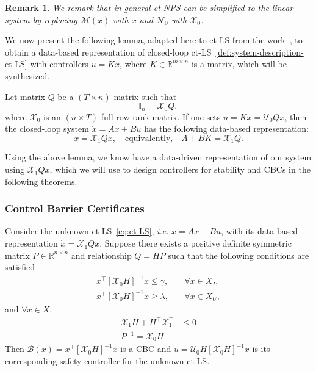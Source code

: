 \documentclass[sigconf]{acmart}
\newtheorem{remark}{Remark}
\newcommand{\identity}{\mathbb{I}}
\begin{document}
\begin{remark}
We remark that in general ct-NPS can be simplified to the linear system by replacing $\mathcal{M}(x)$ with $x$ and $\mathcal{N}_{0}$ with $\mathcal{X}_{0}$.
\end{remark}

We now present the following lemma, adapted here to ct-LS from the work~\cite{de2019formulas}, to obtain a data-based representation of closed-loop ct-LS~\eqref{def:system-description-ct-LS} with controllers $u=Kx$, where $K\in\mathbb{R}^{m\times n}$ is a matrix, which will be synthesized.

\begin{lemma}
\label{lem:Q-ctLS}
Let matrix $Q$ be a $(T\times n)$ matrix such that
\begin{equation}
\label{eq:Q-matrix-ctLS}
\identity_n = \mathcal{X}_{0}Q,
\end{equation}
where $\mathcal{X}_{0}$ is an $(n\times T)$ full row-rank matrix.
If one sets $u=Kx = \mathcal{U}_{0}Qx$, then the closed-loop system $\dot{x}=Ax+Bu$ has the following data-based representation:
\begin{equation}
\label{eq:A+BK=X1TQ-ctLS}
\dot{x} = \mathcal{X}_{1}Qx,\quad\text{equivalently,}\quad A+BK = \mathcal{X}_{1}Q.
\end{equation}
\end{lemma}

Using the above lemma, we know have a data-driven representation of our system using $\mathcal{X}_{1}Qx$, which we will use to design controllers for stability and CBCs in the following theorems.

\subsubsection{Control Barrier Certificates}

\begin{theorem}
\label{thm:data-ctLS-CBC}
Consider the unknown ct-LS~\eqref{eq:ct-LS}, \emph{i.e.} $\dot{x} = Ax+Bu$, with its data-based representation $\dot{x}=\mathcal{X}_{1}Qx$.
Suppose there exists a positive definite symmetric matrix $P\in\mathbb{R}^{n\times n}$ and relationship $Q=HP$ such that the following conditions are satisfied
\begin{align}
\label{eq:ct_CBC_data1}
x^\top [\mathcal{X}_{0}H]^{-1}x \leq \gamma, &\quad\forall x\in X_I, \\
\label{eq:ct_CBC_data2}
x^\top [\mathcal{X}_{0}H]^{-1}x \geq \lambda, &\quad\forall x\in X_U,
\end{align}
and $\forall x\in X$,
\begin{align}
\label{eq:ct_CBC_data3}
\mathcal{X}_{1}H + H^\top\mathcal{X}_{1}^\top &\leq 0\\
\label{eq:ct_CBC_data0}
P^{-1} = \mathcal{X}_{0}H.
\end{align}
Then $\mathcal{B}(x) = x^\top [\mathcal{X}_{0}H]^{-1}x$ is a CBC and $u = \mathcal{U}_{0}H[\mathcal{X}_{0}H]^{-1}x$ is its corresponding safety controller for the unknown ct-LS.
\end{theorem}
\end{document}

